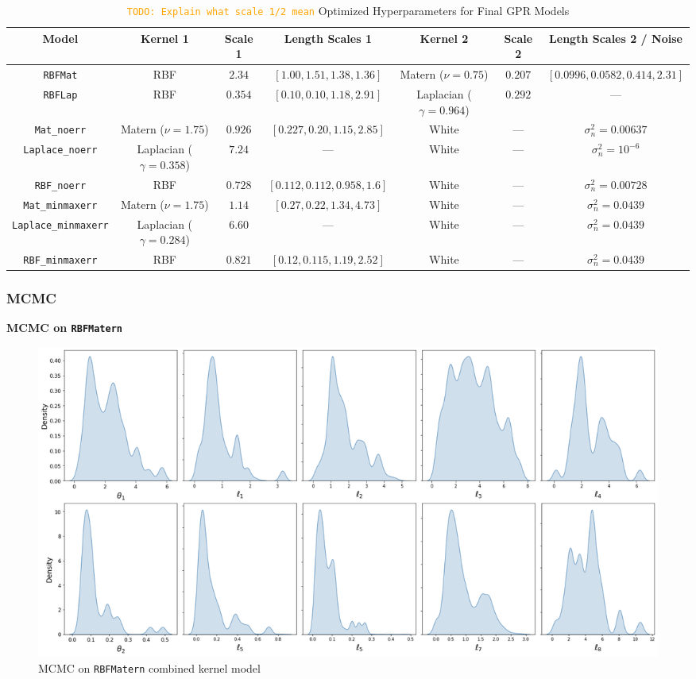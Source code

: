 \documentclass[12pt]{article}
\newcommand{\todo}[1]{\textcolor{orange}{\texttt{TODO: #1}}}
\begin{document}
\begin{table}[H]
\centering
\caption{\todo{Explain what scale 1/2 mean} Optimized Hyperparameters for Final GPR Models}
\footnotesize  %
\renewcommand{\arraystretch}{1.15}  %
\setlength{\tabcolsep}{4pt}  %
\label{tab:final_gpr_hyperparams}
{\fontsize{7}{9.5}\selectfont
\begin{tabular}{|c|c|c|c|c|c|c|}
\hline
\textbf{Model} & \textbf{Kernel 1} & \textbf{Scale 1} & \textbf{Length Scales 1} & \textbf{Kernel 2} & \textbf{Scale 2} & \textbf{Length Scales 2 / Noise} \\
\hline
\texttt{RBFMat} & RBF & $2.34$ & $[1.00, 1.51, 1.38, 1.36]$ & Matern ($\nu = 0.75$) & $0.207$ & $[0.0996, 0.0582, 0.414, 2.31]$ \\
\texttt{RBFLap} & RBF & $0.354$ & $[0.10, 0.10, 1.18, 2.91]$ & Laplacian ($\gamma = 0.964$) & $0.292$ & --- \\
\texttt{Mat\_noerr} & Matern ($\nu = 1.75$) & $0.926$ & $[0.227, 0.20, 1.15, 2.85]$ & White & --- & $\sigma_n^2 = 0.00637$ \\
\texttt{Laplace\_noerr} & Laplacian ($\gamma = 0.358$) & $7.24$ & --- & White & --- & $\sigma_n^2 = 10^{-6}$ \\
\texttt{RBF\_noerr} & RBF & $0.728$ & $[0.112, 0.112, 0.958, 1.6]$ & White & --- & $\sigma_n^2 = 0.00728$ \\
\texttt{Mat\_minmaxerr} & Matern ($\nu = 1.75$) & $1.14$ & $[0.27, 0.22, 1.34, 4.73]$ & White & --- & $\sigma_n^2 = 0.0439$ \\
\texttt{Laplace\_minmaxerr} & Laplacian ($\gamma = 0.284$) & $6.60$ & --- & White & --- & $\sigma_n^2 = 0.0439$ \\
\texttt{RBF\_minmaxerr} & RBF & $0.821$ & $[0.12, 0.115, 1.19, 2.52]$ & White & --- & $\sigma_n^2 = 0.0439$ \\
\hline
\end{tabular}}
\end{table}


\subsubsection*{MCMC}
\textbf{MCMC on \texttt{RBFMatern}}
\begin{figure}[H]
    \centering
    \includegraphics[width=1\textwidth]{LatexPlots/final_gps_plots/MCMCRBFMat.png}
    \caption{MCMC on \texttt{RBFMatern} combined kernel model}
    \label{fig:MCMCRBFMatern}
\end{figure}
\end{document}
